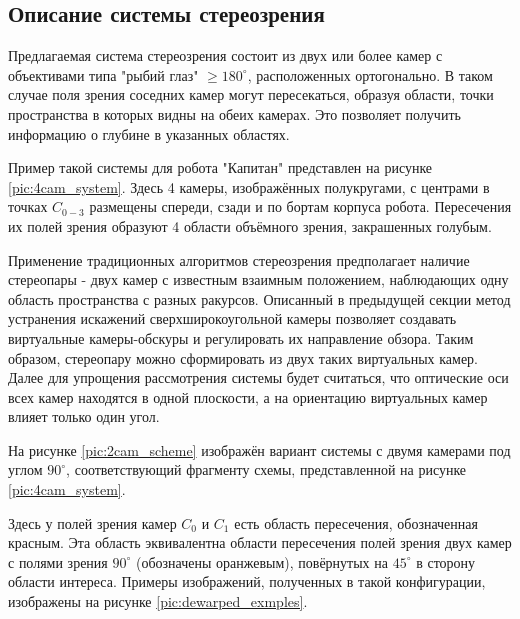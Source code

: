 \subsection{Описание системы стереозрения}

Предлагаемая система стереозрения состоит из двух или более камер с объективами типа "рыбий глаз" $\geqslant 180^\circ$,
расположенных ортогонально. В таком случае поля зрения соседних камер могут пересекаться, 
образуя  области, точки пространства в которых видны на обеих камерах. Это позволяет получить информацию о 
глубине в указанных областях. %

Пример такой системы для робота "Капитан" представлен на рисунке \ref{pic:4cam_system}. Здесь 4 камеры, изображённых
 полукругами, с центрами в точках $C_{0-3}$ размещены спереди, сзади и по бортам корпуса робота. Пересечения их полей зрения 
 образуют 4 области объёмного зрения, закрашенных голубым.    %
 

Применение традиционных алгоритмов стереозрения предполагает наличие стереопары - двух камер с известным взаимным положением,
наблюдающих  одну область пространства с разных ракурсов. Описанный в предыдущей секции метод  устранения искажений 
сверхширокоугольной камеры позволяет создавать виртуальные камеры-обскуры и регулировать их направление обзора. Таким образом,
стереопару можно сформировать из двух таких виртуальных камер.  %
Далее для упрощения рассмотрения системы будет считаться, что оптические оси всех камер находятся в одной плоскости, 
а на ориентацию виртуальных камер влияет только один угол. %

На рисунке \ref{pic:2cam_scheme} изображён вариант системы с двумя камерами под углом $90^\circ$, соответствующий фрагменту схемы,     
  представленной на рисунке \ref{pic:4cam_system}. 


  Здесь у полей зрения камер $C_0$ и $C_1$ есть область пересечения, обозначенная красным. 
Эта область эквивалентна области пересечения полей зрения двух камер с полями зрения $90^\circ$ (обозначены
оранжевым), повёрнутых на $45^\circ$ в сторону области интереса. Примеры изображений, полученных в такой конфигурации,
изображены на рисунке \ref{pic:dewarped_exmples}. 


